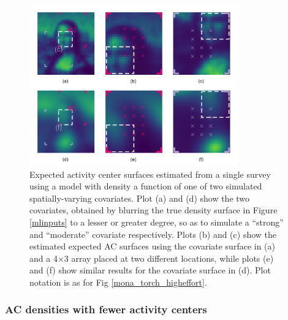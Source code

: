 \documentclass[10pt,a4paper]{article}
\begin{document}
\begin{figure}[htbp]
\centering
\includegraphics[width=0.8\textwidth]{mona_covariates.png}
\caption{Expected activity center surfaces estimated from a single survey using a model with density a function of one of two simulated spatially-varying covariates. Plot (a) and (d) show the two covariates, obtained by blurring the true density surface in Figure \ref{mlinputs} to a lesser or greater degree, so as to simulate a ``strong'' and ``moderate'' covariate respectively. Plots (b) and (c) show the estimated expected AC surfaces using the covariate surface in (a) and a 4$\times$3 array placed at two different locations, while plots (e) and (f) show similar results for the covariate surface in (d). Plot notation is as for Fig \ref{mona_torch_higheffort}.} 
\label{mona_covariates}
\end{figure}

\subsubsection{AC densities with fewer activity centers}
\end{document}
